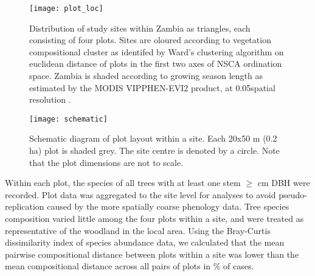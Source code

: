 \documentclass[11pt,a4paper]{article}
\begin{document}
\begin{figure}[H]
\centering
	\texttt{[image: plot\_loc]}
	\caption{Distribution of study sites within Zambia as triangles, each consisting of four plots. Sites are oloured according to vegetation compositional cluster as identifed by Ward's clustering algorithm on euclidean distance of plots in the first two axes of NSCA ordination space. Zambia is shaded according to growing season length as estimated by the MODIS VIPPHEN-EVI2 product, at 0.05\textdegree spatial resolution \citep{VIPPHEN}.}
	\label{plot_loc}
\end{figure}

\begin{figure}[H]
\centering
	\texttt{[image: schematic]}
	\caption{Schematic diagram of plot layout within a site. Each 20x50 m (0.2 ha) plot is shaded grey. The site centre is denoted by a circle. Note that the plot dimensions are not to scale.}
	\label{schematic}
\end{figure}

Within each plot, the species of all trees with at least one stem $\geq$\stemSize{} cm DBH were recorded. Plot data was aggregated to the site level for analyses to avoid pseudo-replication caused by the more spatially coarse phenology data. Tree species composition varied little among the four plots within a site, and were treated as representative of the woodland in the local area. Using the Bray-Curtis dissimilarity index of species abundance data, we calculated that the mean pairwise compositional distance between plots within a site was lower than the mean compositional distance across all pairs of plots in \plotDistPer{}\% of cases.
\end{document}
